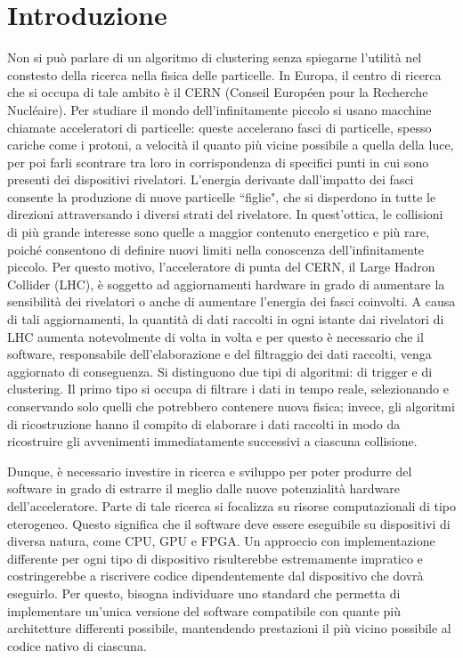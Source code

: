 \documentclass[12pt,a4paper]{report}
\begin{document}
\chapter*{Introduzione}
Non si può parlare di un algoritmo di clustering senza spiegarne l'utilità nel constesto della ricerca nella fisica delle particelle. In Europa, il centro di ricerca che si occupa di tale ambito è il CERN (Conseil Européen pour la Recherche Nucléaire). Per studiare il mondo dell'infinitamente piccolo si usano macchine chiamate acceleratori di particelle: queste accelerano fasci di particelle, spesso cariche come i protoni, a velocità il quanto più vicine possibile a quella della luce, per poi farli scontrare tra loro in corrispondenza di specifici punti in cui sono presenti dei dispositivi rivelatori. L'energia derivante dall'impatto dei fasci consente la produzione di nuove particelle ``figlie", che si disperdono in tutte le direzioni attraversando i diversi strati del rivelatore. In quest'ottica, le collisioni di più grande interesse sono quelle a maggior contenuto energetico e più rare, poiché consentono di definire nuovi limiti nella conoscenza dell'infinitamente piccolo. Per questo motivo, l'acceleratore di punta del CERN, il Large Hadron Collider (LHC), è soggetto ad aggiornamenti hardware in grado di aumentare la sensibilità dei rivelatori o anche di aumentare l'energia dei fasci coinvolti. A causa di tali aggiornamenti, la quantità di dati raccolti in ogni istante dai rivelatori di LHC aumenta notevolmente di volta in volta e per questo è necessario che il software, responsabile dell'elaborazione e del filtraggio dei dati raccolti, venga aggiornato di conseguenza. Si distinguono due tipi di algoritmi: di trigger e di clustering. Il primo tipo si occupa di filtrare i dati in tempo reale, selezionando e conservando solo quelli che potrebbero contenere nuova fisica; invece, gli algoritmi di ricostruzione hanno il compito di elaborare i dati raccolti in modo da ricostruire gli avvenimenti immediatamente successivi a ciascuna collisione.

Dunque, è necessario investire in ricerca e sviluppo per poter produrre del software in grado di estrarre il meglio dalle nuove potenzialità hardware dell'acceleratore. Parte di tale ricerca si focalizza su risorse computazionali di tipo eterogeneo. Questo significa che il software deve essere eseguibile su dispositivi di diversa natura, come CPU, GPU e FPGA. Un approccio con implementazione differente per ogni tipo di dispositivo risulterebbe estremamente impratico e costringerebbe a riscrivere codice dipendentemente dal dispositivo che dovrà eseguirlo. Per questo, bisogna individuare uno standard che permetta di implementare un'unica versione del software compatibile con quante più architetture differenti possibile, mantendendo prestazioni il più vicino possibile al codice nativo di ciascuna. 
\end{document}
